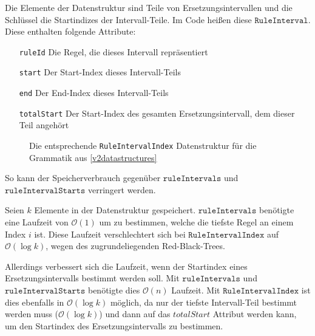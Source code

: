 Die Elemente der Datenstruktur sind Teile von Ersetzungsintervallen und die Schlüssel die Startindizes der Intervall-Teile. Im Code heißen diese $\texttt{RuleInterval}$. Diese enthalten folgende Attribute:
\begin{itemize}[leftmargin=2.5cm]
	\item[\texttt{ruleId}] Die Regel, die dieses Intervall repräsentiert
	\item[\texttt{start}] Der Start-Index dieses Intervall-Teils
	\item[\texttt{end}] Der End-Index dieses Intervall-Teils
	\item[\texttt{totalStart}] Der Start-Index des gesamten Ersetzungsintervall, dem dieser Teil angehört
\end{itemize}

\begin{figure}
	\centering
	
    \caption{Die entsprechende \texttt{RuleIntervalIndex} Datenstruktur für die Grammatik aus \autoref{v2datastructures}}
    \label{v3ruleintervalindex}
\end{figure}

So kann der Speicherverbrauch gegenüber $\texttt{ruleIntervals}$ und $\texttt{ruleIntervalStarts}$ verringert werden. 

Seien $k$ Elemente in der Datenstruktur gespeichert.
$\texttt{ruleIntervals}$ benötigte eine Laufzeit von $\mathcal{O}(1)$ um zu bestimmen, welche die tiefste Regel an einem Index $i$ ist. Diese Laufzeit verschlechtert sich bei $\texttt{RuleIntervalIndex}$ auf $\mathcal{O}(\log k)$, wegen des zugrundeliegenden Red-Black-Trees.

Allerdings verbessert sich die Laufzeit, wenn der Startindex eines Ersetzungsintervalls bestimmt werden soll. Mit $\texttt{ruleIntervals}$ und $\texttt{ruleIntervalStarts}$ benötigte dies $\mathcal{O}(n)$ Laufzeit. Mit $\texttt{RuleIntervalIndex}$ ist dies ebenfalls in $\mathcal{O}(\log k)$ möglich, da nur der tiefste Intervall-Teil bestimmt werden muss ($\mathcal{O}(\log k)$) und dann auf das $totalStart$ Attribut werden kann, um den Startindex des Ersetzungsintervalls zu bestimmen.

